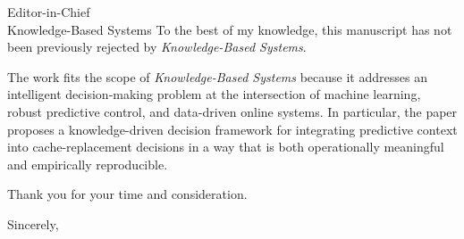 \documentclass[11pt]{letter}
\begin{document}
\begin{letter}{
Editor-in-Chief\\
Knowledge-Based Systems
}
To the best of my knowledge, this manuscript has not been previously rejected by \textit{Knowledge-Based Systems}.%

The work fits the scope of \textit{Knowledge-Based Systems} because it addresses an intelligent decision-making problem at the intersection of machine learning, robust predictive control, and data-driven online systems. In particular, the paper proposes a knowledge-driven decision framework for integrating predictive context into cache-replacement decisions in a way that is both operationally meaningful and empirically reproducible.

Thank you for your time and consideration.

\closing{Sincerely,}

\end{letter}
\end{document}
